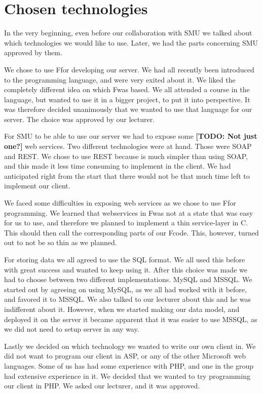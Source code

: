\section{Chosen technologies}
In the very beginning, even before our collaboration with SMU we talked about which technologies we would like to use. Later, we had the parts concerning SMU approved by them.

We chose to use F\Sh for developing our server. We had all recently been introduced to the programming language, and were very exited about it. We liked the completely different idea on which F\Sh was based. We all attended a course in the language, but wanted to use it in a bigger project, to put it into perspective. It was therefore decided unanimously that we wanted to use that language for our server. The choice was approved by our lecturer.

For SMU to be able to use our server we had to expose some \textbf{[TODO: Not just one?]} web services. Two different technologies were at hand. Those were SOAP and REST. We chose to use REST because is much simpler than using SOAP, and this made it less time consuming to implement in the client. We had anticipated right from the start that there would not be that much time left to implement our client. 

We faced some difficulties in exposing web services as we chose to use F\Sh for programming. We learned that webservices in F\Sh was not at a state that was easy for us to use, and therefore we planned to implement a thin service-layer in C\Sh. This should then call the corresponding parts of our F\Sh code. This, however, turned out to not be so thin as we planned.

For storing data we all agreed to use the SQL format. We all used this before with great success and wanted to keep using it. After this choice was made we had to choose between two different implementations. MySQL and MSSQL. We started out by agreeing on using MySQL, as we all had worked with it before, and favored it to MSSQL. We also talked to our lecturer about this and he was indifferent about it. However, when we started making our data model, and deployed it on the server it became apparent that it was easier to use MSSQL, as we did not need to setup server in any way.

Lastly we decided on which technology we wanted to write our own client in. We did not want to program our client in ASP, or any of the other Microsoft web languages. Some of us has had some experience with PHP, and one in the group had extensive experience in it. We decided that we wanted to try programming our client in PHP. We asked our lecturer, and it was approved.
\newpage